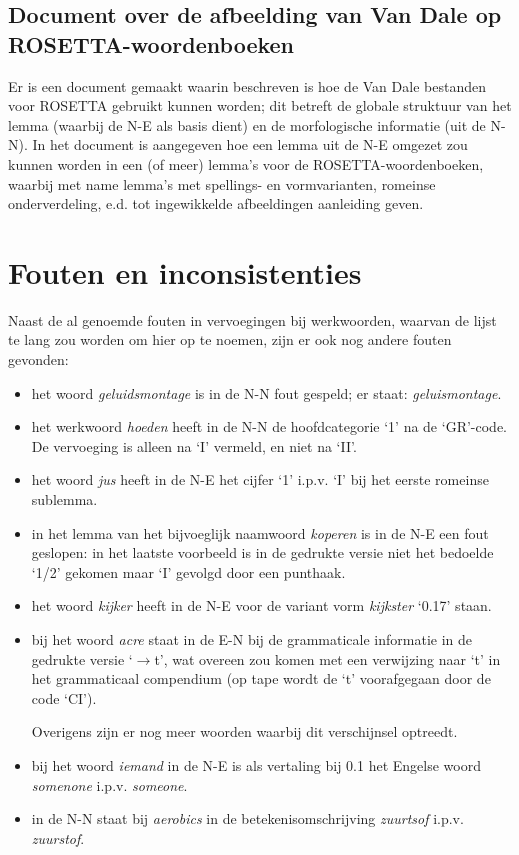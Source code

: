 \subsection{Document over de afbeelding van Van Dale op ROSETTA-woordenboeken}

Er is een document gemaakt waarin beschreven is hoe de Van Dale bestanden
voor ROSETTA gebruikt kunnen worden; dit betreft de globale struktuur van het
lemma (waarbij de N-E als basis dient) en de morfologische informatie (uit
de N-N). In het document is aangegeven hoe een lemma uit de N-E omgezet zou 
kunnen worden in een (of meer) lemma's voor de ROSETTA-woordenboeken, waarbij
met name lemma's met spellings- en vormvarianten, romeinse onderverdeling, e.d.
tot ingewikkelde afbeeldingen aanleiding geven.

\section{Fouten en inconsistenties}

Naast de al genoemde fouten in vervoegingen bij werkwoorden, waarvan de lijst
te lang zou worden om hier op te noemen, zijn er ook nog andere fouten gevonden:
\begin{itemize}
   \item het woord {\em geluidsmontage} is in de N-N fout gespeld; er staat:
         {\em geluismontage}.
   \item het werkwoord {\em hoeden} heeft in de N-N de hoofdcategorie `1' na de
         `GR'-code. De vervoeging is alleen na `I' vermeld, en niet na `II'.
   \item het woord {\em jus} heeft in de N-E het cijfer `1' i.p.v. `I' bij het
         eerste romeinse sublemma.
   \item in het lemma van het bijvoeglijk naamwoord {\em koperen} is in de N-E
         een fout geslopen: in het laatste voorbeeld is in de gedrukte versie
         niet het  bedoelde `1/2' gekomen maar `I' gevolgd door een punthaak.
   \item het woord {\em kijker} heeft in de N-E voor de variant vorm 
         {\em kijkster} `0.17' staan.
   \item bij het woord {\em acre} staat in de E-N bij de grammaticale 
         informatie in de gedrukte versie `$\rightarrow$t', wat overeen zou 
         komen met een verwijzing naar `t' in het grammaticaal compendium (op
         tape wordt de `t' voorafgegaan door de code `CI').

         Overigens zijn er nog meer woorden waarbij dit verschijnsel optreedt.

   \item bij het woord {\em iemand} in de N-E is als vertaling bij 0.1 het 
         Engelse woord {\em some{\em n}one} i.p.v. {\em someone}.
   \item in de N-N staat bij {\em aerobics} in de betekenisomschrijving
         {\em zuurtsof} i.p.v. {\em zuurstof}.
\end{itemize}


